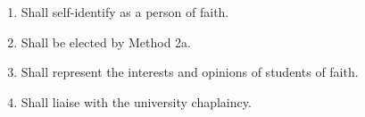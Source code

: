 \begin{enumerate}
    \item Shall self-identify as a person of faith. 
    \item Shall be elected by Method 2a.
    \item Shall represent the interests and opinions of students of faith. 
    \item Shall liaise with the university chaplaincy. 
\end{enumerate}





